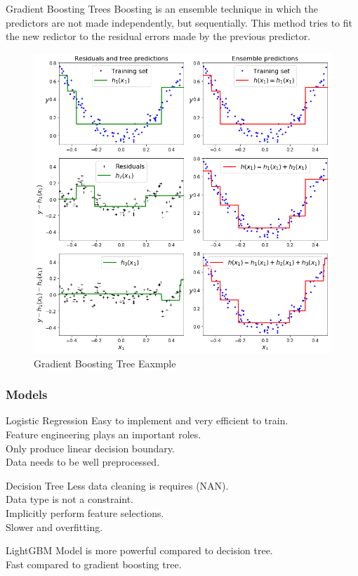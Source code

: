\documentclass{beamer}
\begin{document}
\begin{frame}{Gradient Boosting Trees}
Boosting is an ensemble technique in which the predictors are not made independently, but sequentially. This method tries to fit the new redictor to the residual errors made by the previous predictor. 
\begin{figure}
  \includegraphics[width=0.45\linewidth]{pic/gradient_boosting.png}
  \caption{Gradient Boosting Tree Eaxmple}
  \label{fig:gbt_eg}
\end{figure}

\end{frame}



\begin{frame}
\frametitle{Models}
\begin{block}{Logistic Regression}
Easy to implement and very efficient to train.\\
Feature engineering plays an important roles. \\
Only produce linear decision boundary. \\
 Data needs to be well preprocessed. \\
\end{block}

\begin{block}{Decision Tree}
Less data cleaning is requires (NAN). \\
Data type is not a constraint. \\
Implicitly perform feature selections.\\
Slower and overfitting. 
\end{block}

\begin{block}{LightGBM}
Model is more powerful compared to decision tree.\\
Fast compared to gradient boosting tree.\\
\end{block}
\end{frame}
\end{document}
